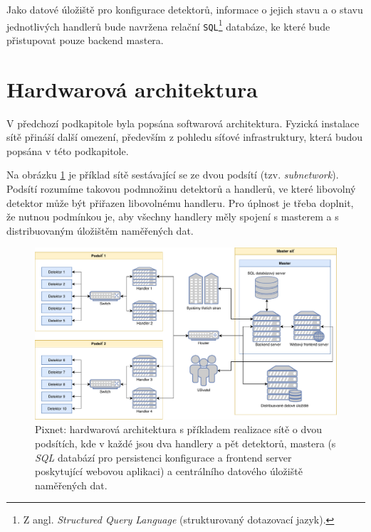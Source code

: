 Jako datové úložiště pro konfigurace detektorů, informace o jejich stavu a o stavu jednotlivých handlerů bude navržena relační \texttt{SQL}\footnote{Z angl. \textit{Structured Query Language} (strukturovaný dotazovací jazyk).} databáze, ke které bude přistupovat pouze backend mastera.

\section{Hardwarová architektura}\label{chap:arch:hw}
V předchozí podkapitole byla popsána softwarová architektura. Fyzická instalace sítě přináší další omezení, především z pohledu síťové infrastruktury, která budou popsána v této podkapitole.

Na obrázku \ref{fig:arch:hw_architecture} je příklad sítě sestávající se ze dvou podsítí (tzv. \textit{subnetwork}). Podsítí rozumíme takovou podmnožinu detektorů a handlerů, ve které libovolný detektor může být přiřazen libovolnému handleru. Pro úplnost je třeba doplnit, že nutnou podmínkou je, aby všechny handlery měly spojení s masterem a s distribuovaným úložištěm naměřených dat.

\begin{figure}[h]
	\begin{center}
		\includegraphics[width=15cm]{figures/arch_hw.pdf}
		\caption{Pixnet: hardwarová architektura s příkladem realizace sítě o dvou podsítích, kde v každé jsou dva handlery a pět detektorů, mastera (s \textit{SQL} databází pro persistenci konfigurace a frontend server poskytující webovou aplikaci) a centrálního datového úložiště naměřených dat.}
		\label{fig:arch:hw_architecture}
	\end{center}
\end{figure}

